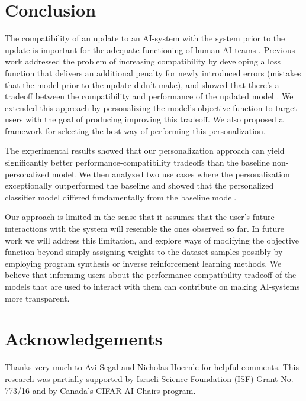 \documentclass[letterpaper]{article} %
\theoremstyle{definition}
\begin{document}
\section{Conclusion}
%
The compatibility of an update to an AI-system with the system prior to the update is important for the adequate functioning of human-AI teams \cite{bansal2019beyond, bansal2019updates}. Previous work addressed the problem of increasing compatibility by developing a loss function that delivers an additional penalty for newly introduced errors (mistakes that the model prior to the update didn’t make), and showed that there's a tradeoff between the compatibility and performance of the updated model \cite{bansal2019updates}. We extended this approach by personalizing the model's objective function to target users with the goal of producing improving this tradeoff. We also proposed a framework for selecting the best way of performing this personalization.

The experimental results showed that our personalization approach can yield significantly better performance-compatibility tradeoffs than the baseline non-personalized model.
We then analyzed two use cases where the personalization exceptionally outperformed the baseline and showed that the personalized classifier model differed fundamentally from the baseline model.

Our approach is limited in the sense that it assumes that the user's future interactions with the system will resemble the ones observed so far.
In future work we will address this limitation, and explore ways of modifying the objective function beyond simply assigning weights to the dataset samples possibly by employing program synthesis or inverse reinforcement learning methods. We believe that informing users  about the   performance-compatibility tradeoff  of the models that are used to interact with them can  contribute on making AI-systems more transparent.



\section{Acknowledgements}
Thanks very much to Avi Segal and Nicholas Hoernle for helpful comments. This research was partially supported by Israeli Science Foundation (ISF) Grant No. 773/16 and by Canada's CIFAR AI Chairs program.
\end{document}

